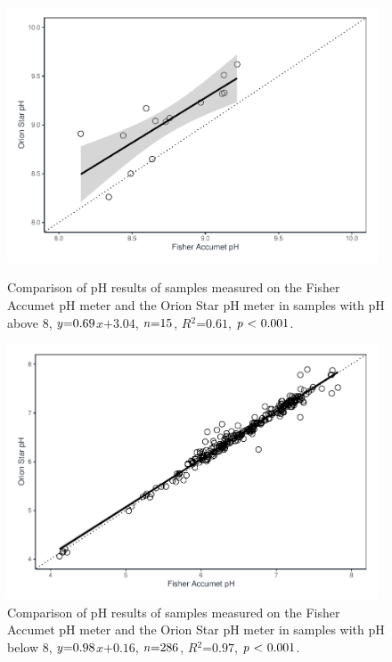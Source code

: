 \documentclass[
]{article}
\begin{document}
\begin{figure}[h]
  \begin{minipage}[t]{0.48\textwidth}
    \centering
    \includegraphics[width=0.98\textwidth]{fisher_v_orion_above_8.pdf}
    \caption{Comparison of pH results of samples measured on the Fisher Accumet pH meter and the Orion Star pH meter in samples with pH above 8, $\mbox{\textit{y}=0.69}$$\textit{x}$$+$$\mbox{3.04}$, $\mbox{\textit{n}=15}$, $\textit{R}$$^2$$\mbox{=0.61}$, $\mbox{\textit{p} < 0.001}$.}
  \end{minipage}
  \hfill
  \begin{minipage}[t]{0.48\textwidth}
    \centering
    \includegraphics[width=0.98\textwidth]{fisher_v_orion_below_8.pdf}
    \caption{Comparison of pH results of samples measured on the Fisher Accumet pH meter and the Orion Star pH meter in samples with pH below 8, $\mbox{\textit{y}=0.98}$$\textit{x}$$+$$\mbox{0.16}$, $\mbox{\textit{n}=286}$, $\textit{R}$$^2$$\mbox{=0.97}$, $\mbox{\textit{p} < 0.001}$.}
  \end{minipage}
\end{figure}
\end{document}

